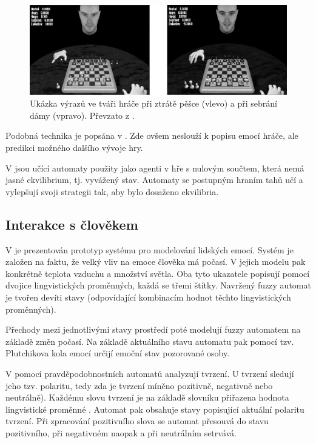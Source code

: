\begin{figure}
 \centering
 \includegraphics[width=\textwidth]{genimg-chess-emos-screens}
 
 \caption[Ukázka výrazů ve tváři hráče]{Ukázka výrazů ve tváři hráče při ztrátě pěšce (vlevo) a při sebrání dámy (vpravo). Převzato z \cite{AlvJoaCru-FuStMaAppEmoModEleGamCha}.} \label{img:ChessEmosScreens}
\end{figure}

Podobná technika je popsána v \cite{Hua+-LeaProbAutModChe}. Zde ovšem neslouží k popisu emocí hráče, ale predikci možného dalšího vývoje hry.

V \cite{FuLi-ForLeaAutAutGam} jsou učící automaty použity jako agenti v hře s nulovým součtem, která nemá jasné ekvilibrium, tj. vyvážený stav. Automaty se postupným hraním tahů učí a vylepšují svoji strategii tak, aby bylo dosaženo ekvilibria.

\subsection{Interakce s člověkem}
V \cite{HeiTri-SimEmoPerHumComInt} je prezentován prototyp systému pro modelování lidských emocí. Systém je založen na faktu, že velký vliv na emoce člověka má počasí. V jejich modelu pak konkrétně teplota vzduchu a množství světla. Oba tyto ukazatele popisují pomocí dvojice lingvistických proměnných, každá se třemi štítky. Navržený fuzzy automat je tvořen devíti stavy (odpovídající kombinacím hodnot těchto lingvistických proměnných).

Přechody mezi jednotlivými stavy prostředí poté modelují fuzzy automatem na základě změn počasí. Na základě aktuálního stavu automatu pak pomocí tzv. Plutchikova kola emocí určijí emoční stav pozorované osoby.


V \cite{Cas+-ProAutAspBasSenAna} pomocí pravděpodobnostních automatů analyzují tvrzení. U tvrzení sledují jeho tzv. polaritu, tedy zda je tvrzení míněno pozitivně, negativně nebo neutrálně). Každému slovu tvrzení je na základě slovníku přiřazena hodnota lingvistické proměnné . Automat pak obsahuje stavy popisující aktuální polaritu tvrzení. Při zpracování pozitivního slova se automat přesouvá do stavu  pozitivního, při negativném naopak a při neutrálním setrvává.

